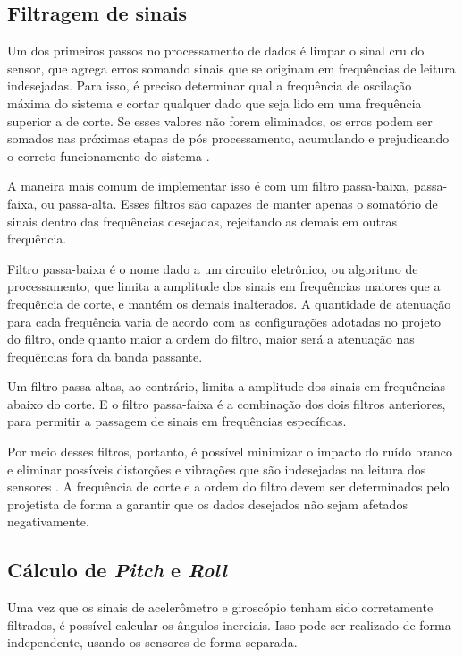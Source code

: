\subsection{Filtragem de sinais}

Um dos primeiros passos no processamento de dados é limpar o sinal cru do sensor, que agrega erros somando sinais que se originam em frequências de leitura indesejadas. Para isso, é preciso determinar qual a frequência de oscilação máxima do sistema e cortar qualquer dado que seja lido em uma frequência superior a de corte. Se esses valores não forem eliminados, os erros podem ser somados nas próximas etapas de pós processamento, acumulando e prejudicando o correto funcionamento do sistema \cite{article:Yang2017}.

A maneira mais comum de implementar isso é com um filtro passa-baixa, passa-faixa, ou passa-alta. Esses filtros são capazes de manter apenas o somatório de sinais dentro das frequências desejadas, rejeitando as demais em outras frequência. 

Filtro passa-baixa é o nome dado a um circuito eletrônico, ou algoritmo de processamento, que limita a amplitude dos sinais em frequências maiores que a frequência de corte, e mantém os demais inalterados. A quantidade de atenuação para cada frequência varia de acordo com as configurações adotadas no projeto do filtro, onde quanto maior a ordem do filtro, maior será a atenuação nas frequências fora da banda passante. 

Um filtro passa-altas, ao contrário, limita a amplitude dos sinais em frequências abaixo do corte. E o filtro passa-faixa é a combinação dos dois filtros anteriores, para permitir a passagem de sinais em frequências específicas.

Por meio desses filtros, portanto, é possível minimizar o impacto do ruído branco e eliminar possíveis distorções e vibrações que são indesejadas na leitura dos sensores \cite{article:Yang2017}. A frequência de corte e a ordem do filtro devem ser determinados pelo projetista de forma a garantir que os dados desejados não sejam afetados negativamente. 

\subsection{Cálculo de \textit{Pitch} e \textit{Roll}}

Uma vez que os sinais de acelerômetro e giroscópio tenham sido corretamente filtrados, é possível calcular os ângulos inerciais. Isso pode ser realizado de forma independente, usando os sensores de forma separada.

